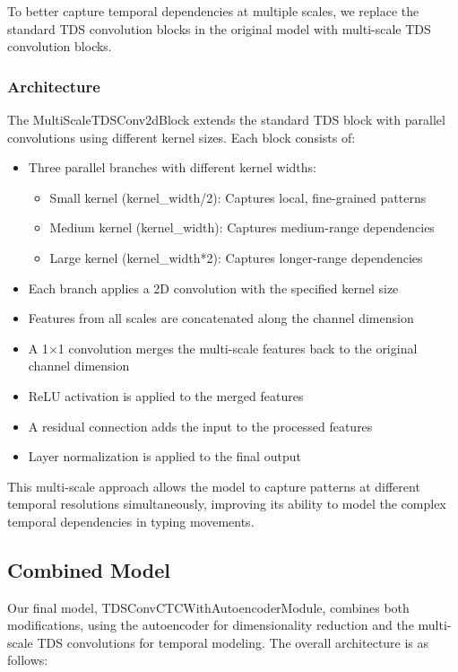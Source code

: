 To better capture temporal dependencies at multiple scales, we replace the standard TDS convolution blocks in the original model with multi-scale TDS convolution blocks.

\subsubsection{Architecture}

The MultiScaleTDSConv2dBlock extends the standard TDS block with parallel convolutions using different kernel sizes. Each block consists of:

\begin{itemize}
    \item Three parallel branches with different kernel widths:
          \begin{itemize}
              \item Small kernel (kernel\_width/2): Captures local, fine-grained patterns
              \item Medium kernel (kernel\_width): Captures medium-range dependencies
              \item Large kernel (kernel\_width*2): Captures longer-range dependencies
          \end{itemize}
    \item Each branch applies a 2D convolution with the specified kernel size
    \item Features from all scales are concatenated along the channel dimension
    \item A 1×1 convolution merges the multi-scale features back to the original channel dimension
    \item ReLU activation is applied to the merged features
    \item A residual connection adds the input to the processed features
    \item Layer normalization is applied to the final output
\end{itemize}

This multi-scale approach allows the model to capture patterns at different temporal resolutions simultaneously, improving its ability to model the complex temporal dependencies in typing movements.

\subsection{Combined Model}

Our final model, TDSConvCTCWithAutoencoderModule, combines both modifications, using the autoencoder for dimensionality reduction and the multi-scale TDS convolutions for temporal modeling. The overall architecture is as follows:

